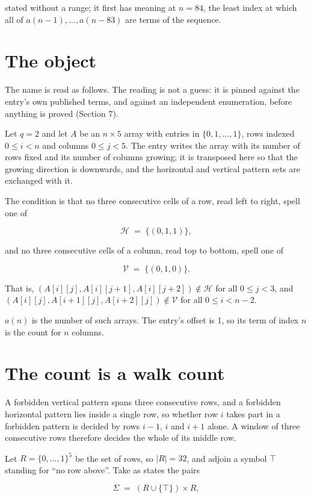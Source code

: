 \documentclass[11pt]{article}
\theoremstyle{definition}
\begin{document}
stated without a range; it first has meaning at $n = 84$, the least index at which all of $a(n-1),\dots,a(n-83)$ are terms of the sequence.

\section{The object}

The name is read as follows. The reading is not a guess: it is pinned against the entry's own published terms, and against an independent enumeration, before anything is proved (Section 7).

Let $q = 2$ and let $A$ be an $n \times 5$ array with entries in $\{0,1,\dots,1\}$, rows indexed $0 \le i < n$ and columns $0 \le j < 5$. The entry writes the array with its number of rows fixed and its number of columns growing; it is transposed here so that the growing direction is downwards, and the horizontal and vertical pattern sets are exchanged with it.

The condition is that no three consecutive cells of a row, read left to right, spell one of

\[\mathcal{H} \;=\; \{(0,1,1)\},\]

and no three consecutive cells of a column, read top to bottom, spell one of

\[\mathcal{V} \;=\; \{(0,1,0)\}.\]

That is, $(A[i][j],A[i][j{+}1],A[i][j{+}2]) \notin \mathcal{H}$ for all $0 \le j < 3$, and $(A[i][j],A[i{+}1][j],A[i{+}2][j]) \notin \mathcal{V}$ for all $0 \le i < n-2$.

$a(n)$ is the number of such arrays. The entry's offset is 1, so its term of index $n$ is the count for $n$ columns.

\section{The count is a walk count}

A forbidden vertical pattern spans three consecutive rows, and a forbidden horizontal pattern lies inside a single row, so whether row $i$ takes part in a forbidden pattern is decided by rows $i-1$, $i$ and $i+1$ alone. A window of three consecutive rows therefore decides the whole of its middle row.

Let $R = \{0,\dots,1\}^{5}$ be the set of rows, so $|R| = 32$, and adjoin a symbol $\top$ standing for ``no row above''. Take as states the pairs

\[\Sigma \;=\; (R \cup \{\top\}) \times R,\]
\end{document}

